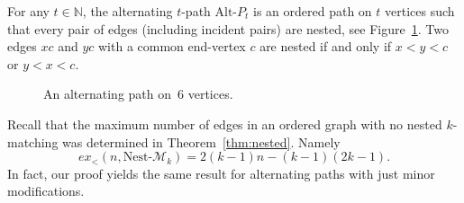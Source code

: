 \documentclass[11pt]{article}
\theoremstyle{definition}
\begin{document}
For any $t\in\mathbb N$, the alternating $t$-path $\text{Alt-}P_t$ is an ordered path on $t$ vertices such that every pair of edges (including incident pairs) are nested, see Figure~\ref{fig:altpath}.
Two edges $xc$ and $yc$ with a common end-vertex $c$ are nested if and only if $x<y<c$ or $y<x<c$.

\begin{figure}[h!]
\centering
{}
\caption{An alternating path on~$6$ vertices.}
\label{fig:altpath}
\end{figure}

Recall that the maximum number of edges in an ordered graph with no nested $k$-matching was determined in Theorem~\ref{thm:nested}. Namely 
$$ex_<(n,\text{Nest-}\mathcal M_k)=2(k-1)n-(k-1)(2k-1).$$ 
In fact, our proof yields the same result for alternating paths with just minor modifications.
\end{document}
